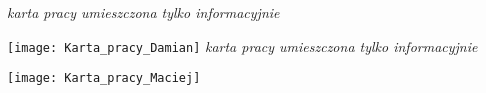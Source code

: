\newpage
\textit{karta pracy umieszczona tylko informacyjnie}

\texttt{[image: Karta\_pracy\_Damian]}
\newpage
\textit{karta pracy umieszczona tylko informacyjnie}

\texttt{[image: Karta\_pracy\_Maciej]}

